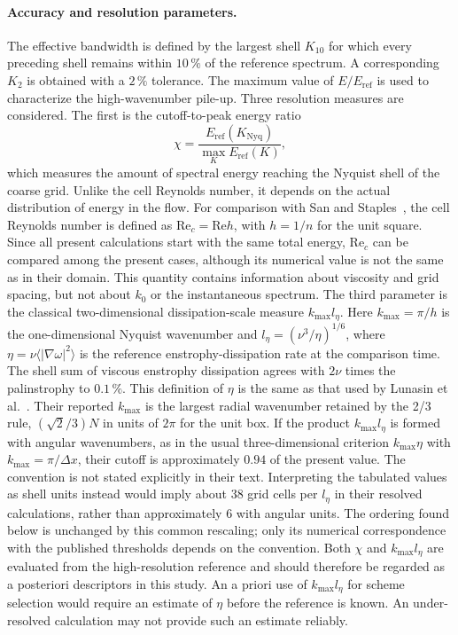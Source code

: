 \documentclass[11pt,a4paper]{article}
\newcommand{\Rey}{\mathrm{Re}}
\begin{document}
\paragraph{Accuracy and resolution parameters.}
The effective bandwidth is defined by the largest shell $K_{10}$ for which every preceding shell remains within $10\,\%$ of the reference spectrum. A corresponding $K_2$ is obtained with a $2\,\%$ tolerance. The maximum value of $E/E_{\mathrm{ref}}$ is used to characterize the high-wavenumber pile-up.
Three resolution measures are considered. The first is the cutoff-to-peak energy ratio
\begin{equation}
\chi=\frac{E_{\mathrm{ref}}(K_{\mathrm{Nyq}})}
{\max_K E_{\mathrm{ref}}(K)},
\end{equation}
which measures the amount of spectral energy reaching the Nyquist shell of the coarse grid. Unlike the cell Reynolds number, it depends on the actual distribution of energy in the flow.
For comparison with San and Staples~\cite{san2012}, the cell Reynolds number is defined as $\Rey_c=\Rey h$, with $h=1/n$ for the unit square. Since all present calculations start with the same total energy, $\Rey_c$ can be compared among the present cases, although its numerical value is not the same as in their domain. This quantity contains information about viscosity and grid spacing, but not about $k_0$ or the instantaneous spectrum.
The third parameter is the classical two-dimensional dissipation-scale measure $k_{\max}l_\eta$. Here $k_{\max}=\pi/h$ is the one-dimensional Nyquist wavenumber and
$l_\eta=(\nu^3/\eta)^{1/6}$, where
$\eta=\nu\langle|\nabla\omega|^2\rangle$ is the reference enstrophy-dissipation rate at the comparison time. The shell sum of viscous enstrophy dissipation agrees with $2\nu$ times the palinstrophy to $0.1\,\%$. This definition of $\eta$ is the same as that used by Lunasin et al.~\cite{lunasin2007}.
Their reported $k_{\max}$ is the largest radial wavenumber retained by the 2/3 rule, $(\sqrt2/3)N$ in units of $2\pi$ for the unit box. If the product $k_{\max}l_\eta$ is formed with angular wavenumbers, as in the usual three-dimensional criterion $k_{\max}\eta$ with $k_{\max}=\pi/\Delta x$, their cutoff is approximately $0.94$ of the present value. The convention is not stated explicitly in their text. Interpreting the tabulated values as shell units instead would imply about 38 grid cells per $l_\eta$ in their resolved calculations, rather than approximately 6 with angular units. The ordering found below is unchanged by this common rescaling; only its numerical correspondence with the published thresholds depends on the convention.
Both $\chi$ and $k_{\max}l_\eta$ are evaluated from the high-resolution reference and should therefore be regarded as a posteriori descriptors in this study. An a priori use of $k_{\max}l_\eta$ for scheme selection would require an estimate of $\eta$ before the reference is known. An under-resolved calculation may not provide such an estimate reliably.
\end{document}
